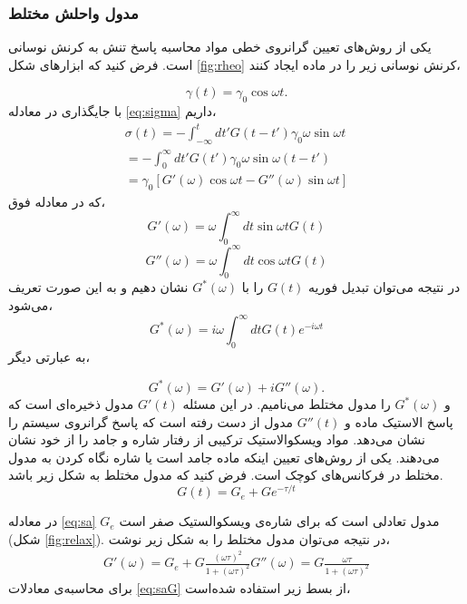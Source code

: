 \subsubsection{مدول واحلش مختلط}
یکی از روش‌های تعیین گرانروی خطی مواد محاسبه پاسخ تنش به کرنش نوسانی‌ است. فرض کنید که ابزارهای شکل \ref{fig:rheo} کرنش نوسانی زیر را در ماده ایجاد کنند،

\begin{equation}
\gamma(t)=\gamma_0\cos\omega t.
\end{equation}
با جایگذاری در معادله \ref{eq:sigma} داریم،
\begin{equation}
\begin{aligned}
\sigma(t)=-\int_{-\infty}^tdt'G(t-t')\gamma_0\omega\sin\omega t\\
	      =-\int_0^\infty dt'G(t')\gamma_0\omega\sin\omega (t-t')\\
	      =\gamma_0\left[G'(\omega)\cos\omega t-G''(\omega)\sin\omega t\right]
\end{aligned}
\end{equation}
که در معادله فوق،
\begin{equation}
G'(\omega)=\omega\int_0^\infty dt\sin\omega t G(t)
\end{equation}
\begin{equation}
G''(\omega)=\omega\int_0^\infty dt\cos\omega t G(t)
\end{equation}
در نتیجه می‌توان تبدیل فوریه $G(t)$ را با $G^*(\omega)$ نشان ‌دهیم و به این صورت تعریف می‌شود،
\begin{equation}
G^*(\omega)=i\omega\int_0^\infty dtG(t)e^{-i\omega t}
\end{equation}
به عبارتی دیگر، 

\begin{equation}
G^*(\omega)=G'(\omega)+iG''(\omega).
\label{eq:g*}
\end{equation}
و  $G^*(\omega)$ را مدول مختلط می‌نامیم. در این مسئله $G'(t)$  مدول ذخیره‌ای است که پاسخ الاستیک ماده و $G''(t)$ مدول از دست رفته است که پاسخ گرانروی سیستم را نشان می‌دهد. مواد ویسکوالاستیک ترکیبی از رفتار‌ شاره و جامد را از خود نشان می‌دهند. یکی از روش‌های تعیین اینکه ماده جامد است یا شاره نگاه کردن به مدول مختلط در فرکانس‌های کوچک است. فرض کنید که مدول مختلط به شکل زیر باشد.
\begin{equation}
G(t)=G_e+Ge^{-\tau/t}
\label{eq:sa}
\end{equation}

در معادله \ref{eq:sa} $G_e$ مدول تعادلی است که برای شاره‌‌ی ویسکوالستیک صفر است (شکل \ref{fig:relax}). در نتیجه می‌توان مدول مختلط را  به شکل زیر نوشت،
\begin{equation}
\begin{aligned}
G'(\omega)=G_e+G\frac{(\omega\tau)^2}{1+(\omega\tau)^2}
G''(\omega)=G\frac{\omega\tau}{1+(\omega\tau)^2}
\label{eq:saG}
\end{aligned}
\end{equation}
برای محاسبه‌ی معادلات \ref{eq:saG} از بسط زیر استفاده شده‌است،

